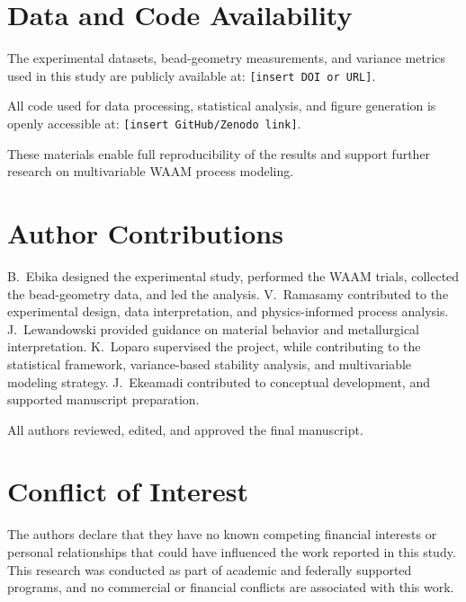 \documentclass[conference]{IEEEtran}
\begin{document}
\section*{Data and Code Availability}

The experimental datasets, bead-geometry measurements, and variance metrics used in this study are publicly available at:
\texttt{[insert DOI or URL]}.

All code used for data processing, statistical analysis, and figure generation is openly accessible at:
\texttt{[insert GitHub/Zenodo link]}.

These materials enable full reproducibility of the results and support further research on multivariable WAAM process modeling.

\section*{Author Contributions}

B.~Ebika designed the experimental study, performed the WAAM trials, collected the bead-geometry data, and led the analysis. 
V.~Ramasamy contributed to the experimental design, data interpretation, and physics-informed process analysis. 
J.~Lewandowski provided guidance on material behavior and metallurgical interpretation. 
K.~Loparo supervised the project, while contributing to the statistical framework, variance-based stability analysis, and multivariable modeling strategy. 
J.~Ekeamadi contributed to conceptual development, and supported manuscript preparation. 

All authors reviewed, edited, and approved the final manuscript.


\section*{Conflict of Interest}

The authors declare that they have no known competing financial interests or personal relationships that could have influenced the work reported in this study. This research was conducted as part of academic and federally supported programs, and no commercial or financial conflicts are associated with this work.








\end{document}
